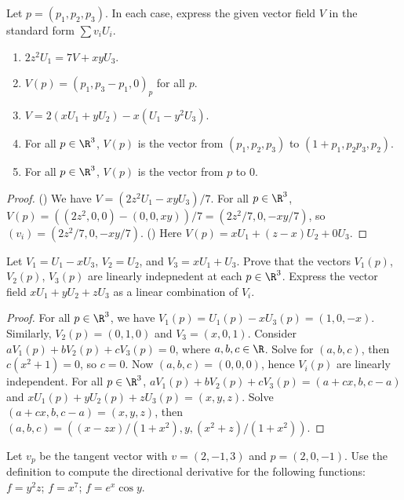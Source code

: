 \begin{exercise}[1.2.3]
    Let $p=({p}_{1},{p}_{2},{p}_{3})$. In each case, express the given vector field $V$ in the standard form $\sum{v}_{i}{U}_{i}$. 
    \begin{enumerate}
        \item $2{z}^{2}{U}_{1}=7V+xy{U}_{3}$.
        \item $V(p)={({p}_{1},{p}_{3}-{p}_{1},0)}_{p}$ for all $p$.
        \item $V=2(x{U}_{1}+y{U}_{2})-x({U}_{1}-{y}^{2}{U}_{3})$.
        \item For all $p\in{\R}^{3}$, $V(p)$ is the vector from $({p}_{1},{p}_{2},{p}_{3})$ to $(1+{p}_{1},{p}_{2}{p}_{3},{p}_{2})$.
        \item For all $p\in{\R}^{3}$, $V(p)$ is the vector from $p$ to 0.
    \end{enumerate}
\end{exercise}
\begin{proof}
    () We have $V=(2{z}^{2}{U}_{1}-xy{U}_{3})/7$. For all $p\in{\R}^{3}$, $V(p)=((2{z}^{2},0,0)-(0,0,xy))/7=(2{z}^{2}/7,0,-xy/7)$, so $({v}_{i})=(2{z}^{2}/7,0,-xy/7)$. () Here $V(p)=x{U}_{1}+(z-x){U}_{2}+0{U}_{3}$.
\end{proof}
\begin{exercise}[1.2.5]
    Let ${V}_{1}={U}_{1}-x{U}_{3}$, ${V}_{2}={U}_{2}$, and ${V}_{3}=x{U}_{1}+{U}_{3}$. Prove that the vectors ${V}_{1}(p)$, ${V}_{2}(p)$, ${V}_{3}(p)$ are linearly indepnedent at each $p\in{\R}^{3}$. Express the vector field $x{U}_{1}+y{U}_{2}+z{U}_{3}$ as a linear combination of ${V}_{i}$.
\end{exercise}
\begin{proof}
    For all $p\in{\R}^{3}$, we have ${V}_{1}(p)={U}_{1}(p)-x{U}_{3}(p)=(1,0,-x)$. Similarly, ${V}_{2}(p)=(0,1,0)$ and ${V}_{3}=(x,0,1)$. Consider $a{V}_{1}(p)+b{V}_{2}(p)+c{V}_{3}(p)=0$, where $a,b,c\in\R$. Solve for $(a,b,c)$, then $c({x}^{2}+1)=0$, so $c=0$. Now $(a,b,c)=(0,0,0)$, hence ${V}_{i}(p)$ are linearly independent. For all $p\in{\R}^{3}$, $a{V}_{1}(p)+b{V}_{2}(p)+c{V}_{3}(p)=(a+cx,b,c-a)$ and $x{U}_{1}(p)+y{U}_{2}(p)+z{U}_{3}(p)=(x,y,z)$. Solve $(a+cx,b,c-a)=(x,y,z)$, then $(a,b,c)=((x-zx)/(1+{x}^{2}),y,({x}^{2}+z)/(1+{x}^{2}))$. 
\end{proof}
\begin{exercise}[1.3.1]
    Let ${v}_{p}$ be the tangent vector with $v=(2,-1,3)$ and $p=(2,0,-1)$. Use the definition to compute the directional derivative for the following functions: $f={y}^{2}z$; $f={x}^{7}$; $f={e}^{x}\cos y$.
\end{exercise}
